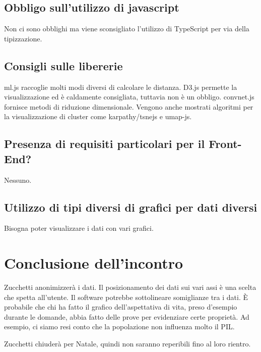 \documentclass{article}
\begin{document}
    \subsection{Obbligo sull'utilizzo di javascript}
    \label{sub:domanda_16}
    Non ci sono obblighi ma viene sconsigliato l'utilizzo di TypeScript per via della tipizzazione.

    \subsection{Consigli sulle libererie}
    \label{sub:domanda_17}
    ml.js raccoglie molti modi diversi di calcolare le distanza. D3.js permette la visualizzazione ed è caldamente consigliata, tuttavia non è un obbligo. 
    convnet.js fornisce metodi di riduzione dimensionale. Vengono anche mostrati algoritmi per la visualizzazione di cluster come karpathy/tsnejs e umap-js. 

    \subsection{Presenza di requisiti particolari per il Front-End?}
    \label{sub:domanda_18}
    Nessuno.

    \subsection{Utilizzo di tipi diversi di grafici per dati diversi}
    \label{sub:domanda_19}
    Bisogna poter visualizzare i dati con vari grafici. 

\section{Conclusione dell'incontro}
\label{sec:conclusione}
Zucchetti anonimizzerà i dati. Il posizionamento dei dati sui vari assi è una scelta che spetta all'utente. Il software potrebbe sottolineare somiglianze tra i dati. È probabile che chi ha fatto il grafico dell'aspettativa di vita, preso d'esempio durante le domande, abbia fatto delle prove per evidenziare certe proprietà. Ad esempio, ci siamo resi conto che la popolazione non influenza molto il PIL.

Zucchetti chiuderà per Natale, quindi non saranno reperibili fino al loro rientro.
\end{document}
